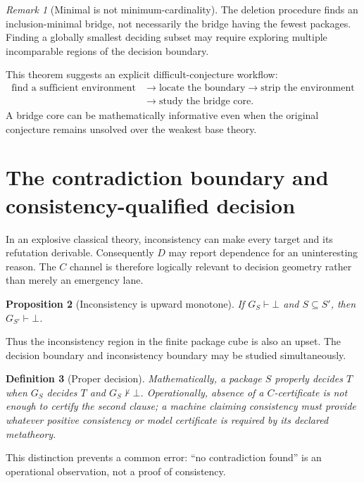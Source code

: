 \documentclass[11pt]{article}
\newtheorem{definition}{Definition}[section]
\newtheorem{proposition}[definition]{Proposition}
\theoremstyle{remark}
\newtheorem{remark}[definition]{Remark}
\begin{document}
\begin{remark}[Minimal is not minimum-cardinality]
The deletion procedure finds an inclusion-minimal bridge, not necessarily the bridge having the fewest packages. Finding a globally smallest deciding subset may require exploring multiple incomparable regions of the decision boundary.
\end{remark}

This theorem suggests an explicit difficult-conjecture workflow:
\[
\begin{aligned}
\text{find a sufficient environment}&\to\text{locate the boundary}\to\text{strip the environment}\\
&\to\text{study the bridge core}.
\end{aligned}
\]
A bridge core can be mathematically informative even when the original conjecture remains unsolved over the weakest base theory.

\section{The contradiction boundary and consistency-qualified decision}

In an explosive classical theory, inconsistency can make every target and its refutation derivable. Consequently $D$ may report dependence for an uninteresting reason. The $C$ channel is therefore logically relevant to decision geometry rather than merely an emergency lane.

\begin{proposition}[Inconsistency is upward monotone]
If $G_S\vdash\bot$ and $S\subseteq S'$, then $G_{S'}\vdash\bot$.
\end{proposition}

Thus the inconsistency region in the finite package cube is also an upset. The decision boundary and inconsistency boundary may be studied simultaneously.

\begin{definition}[Proper decision]
Mathematically, a package $S$ \emph{properly decides} $T$ when $G_S$ decides $T$ and $G_S\nvdash\bot$. Operationally, absence of a $C$-certificate is not enough to certify the second clause; a machine claiming consistency must provide whatever positive consistency or model certificate is required by its declared metatheory.
\end{definition}

This distinction prevents a common error: ``no contradiction found'' is an operational observation, not a proof of consistency.
\end{document}
